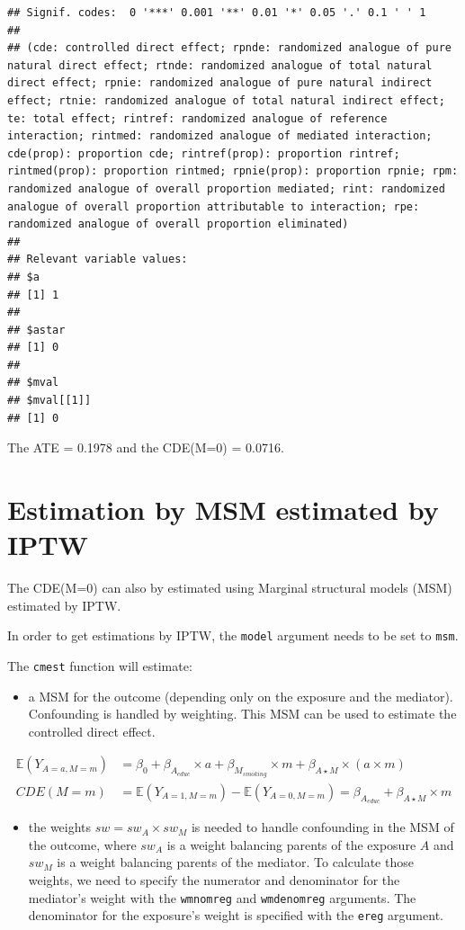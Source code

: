 \documentclass[
]{book}
\providecommand{\tightlist}{%
  \setlength{\itemsep}{0pt}\setlength{\parskip}{0pt}}
\begin{document}
\begin{verbatim}
## Signif. codes:  0 '***' 0.001 '**' 0.01 '*' 0.05 '.' 0.1 ' ' 1
## 
## (cde: controlled direct effect; rpnde: randomized analogue of pure natural direct effect; rtnde: randomized analogue of total natural direct effect; rpnie: randomized analogue of pure natural indirect effect; rtnie: randomized analogue of total natural indirect effect; te: total effect; rintref: randomized analogue of reference interaction; rintmed: randomized analogue of mediated interaction; cde(prop): proportion cde; rintref(prop): proportion rintref; rintmed(prop): proportion rintmed; rpnie(prop): proportion rpnie; rpm: randomized analogue of overall proportion mediated; rint: randomized analogue of overall proportion attributable to interaction; rpe: randomized analogue of overall proportion eliminated)
## 
## Relevant variable values: 
## $a
## [1] 1
## 
## $astar
## [1] 0
## 
## $mval
## $mval[[1]]
## [1] 0
\end{verbatim}

The ATE = 0.1978 and the CDE(M=0) = 0.0716.

\section{Estimation by MSM estimated by IPTW}\label{estimation-by-msm-estimated-by-iptw}

The CDE(M=0) can also by estimated using Marginal structural models (MSM) estimated by IPTW.

In order to get estimations by IPTW, the \texttt{model} argument needs to be set to \texttt{msm}.

The \texttt{cmest} function will estimate:

\begin{itemize}
\tightlist
\item
  a MSM for the outcome (depending only on the exposure and the mediator). Confounding is handled by weighting. This MSM can be used to estimate the controlled direct effect.
\end{itemize}

\begin{align*}
    \mathbb{E}(Y_{A=a,M=m}) &= \beta_0 + \beta_{A_{educ}} \times a + \beta_{M_{smoking}} \times m + \beta_{A \star M} \times (a \times m) \\
    CDE(M=m) &= \mathbb{E}(Y_{A=1,M=m}) - \mathbb{E}(Y_{A=0,M=m}) = \beta_{A_{educ}} + \beta_{A \star M} \times m
  \end{align*}

\begin{itemize}
\tightlist
\item
  the weights \(sw = sw_A \times sw_M\) is needed to handle confounding in the MSM of the outcome, where \(sw_A\) is a weight balancing parents of the exposure \(A\) and \(sw_M\) is a weight balancing parents of the mediator. To calculate those weights, we need to specify the numerator and denominator for the mediator's weight with the \texttt{wmnomreg} and \texttt{wmdenomreg} arguments. The denominator for the exposure's weight is specified with the \texttt{ereg} argument.
\end{itemize}
\end{document}
